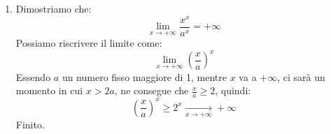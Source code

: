 \begin{enumerate}
	\item Dimostriamo che:
		\begin{equation*}
			\lim_{x \to + \infty} \dfrac{x^x}{a^x} = +\infty
		\end{equation*}
		Possiamo riscrivere il limite come:
		\begin{equation*}
			\lim_{x \to + \infty} \left(\dfrac{x}{a}\right)^x
		\end{equation*}
		Essendo $a$ un numero fisso maggiore di 1, mentre $x$ va a $+\infty$, ci sarà un momento in cui $x > 2a$, ne consegue che $\frac{x}{a} \geq 2$, quindi:
		\begin{equation*}
			\left(\dfrac{x}{a}\right)^x \geq 2^x \xrightarrow[x \to +\infty]{} +\infty
		\end{equation*}
		Finito.
\end{enumerate}

